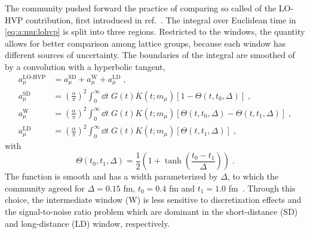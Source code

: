 The community pushed forward the practice of comparing so called  of the LO-HVP contribution, first introduced in ref.~\cite{Lehner:2017kuc,RBC_2018}.
The integral over Euclidean time in \cref{eq:a:mu:lohvp} is split into three regions.
Restricted to the windows, the quantity allows for better comparison among lattice groups, because each window has different sources of uncertainty.
The boundaries of the integral are smoothed of by a convolution with a hyperbolic tangent,
\begin{align} \label{eq:a:mu:lohvp:windows}
a_{\mu}^{\text{LO-HVP}} &= a_{\mu}^{\text{SD}} + a_{\mu}^{\text{W}} + a_{\mu}^{\text{LD}} \;, \\
a_{\mu}^{\text{SD}} &=
\left( \frac{\alpha}{\pi} \right)^{2} \int_{0}^{\infty} \dd t \; G(t) K(t; m_{\mu}) \left[ 1 - \Theta(t, t_0, \Delta) \right] \;, \\
a_{\mu}^{\text{W}} &=
\left( \frac{\alpha}{\pi} \right)^{2} \int_{0}^{\infty} \dd t \; G(t) K(t; m_{\mu}) \left[ \Theta(t, t_0, \Delta) - \Theta(t, t_1, \Delta) \right] \;, \\
a_{\mu}^{\text{LD}} &=
\left( \frac{\alpha}{\pi} \right)^{2} \int_{0}^{\infty} \dd t \; G(t) K(t; m_{\mu}) \left[ \Theta(t, t_1, \Delta) \right] \;,
\end{align}
with
\begin{equation}
\Theta(t_0, t_1, \Delta) = \frac{1}{2} \left( 1 + \tanh\left( \frac{t_0 - t_1}{\Delta} \right) \right) \;.
\end{equation}
The function is smooth and has a width parameterized by $\Delta$, to which the community agreed for $\Delta = 0.15$ fm, $t_0 = 0.4$ fm and $t_1 = 1.0$ fm~\cite{RBC_2018}.
Through this choice, the intermediate window (W) is less sensitive to discretization effects and the signal-to-noise ratio problem which are dominant in the short-distance (SD) and long-distance (LD) window, respectively.


